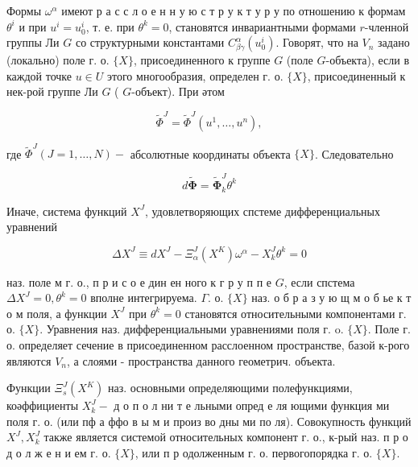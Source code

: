 \documentclass[10pt]{article}
\begin{document}
Формы $\omega^{\alpha}$ имеют р а с с л о е н н у ю с т р у к т у р у по отношению к формам $\theta^{i}$ и при $u^{i}=u_{0}^{i}$, т. е. при $\theta^{k}=0$, становятся инвариантными формами $r$-членной группы Ли $G$ со структурными константами $C_{\beta \gamma}^{\alpha}\left(u_{0}^{i}\right)$. Говорят, что на $V_{n}$ задано (локально) поле г. о. $\{X\}$, присоединенного к группе $G$ (поле $G$-объекта), если в каждой точке $u \in U$ этого многообразия, определен г. о. $\{X\}$, присоединенный к нек-рой группе Ли $G$ ( $G$-объект). При әтом



\[

\widetilde{\Phi}^{J}=\tilde{\Phi}^{J}\left(u^{1}, \ldots, u^{n}\right),

\]



где $\tilde{\Phi}^{J}(J=1, \ldots, N)-$ абсолютные координаты объекта $\{X\}$. Следовательно



\[

d \tilde{\boldsymbol{\Phi}}=\widetilde{\boldsymbol{\Phi}}_{k}^{J} \theta^{k}

\]



Иначе, система функций $X^{J}$, удовлетворяющих спстеме дифференциальных уравнений



\[

\Delta X^{J} \equiv d X^{J}-\Xi_{\alpha}^{J}\left(X^{K}\right) \omega^{\alpha}-X_{k}^{J} \theta^{k}=0

\]



наз. поле м г. о., п р и с о е дин ен ного к г р у п п е $G$, если спстема $\Delta X^{J}=0, \theta^{k}=0$ вполне интегрируема. $\Gamma$. о. $\{X\}$ наз. о б р а з у ю щ м о б ье к т о м поля, а функции $X^{J}$ при $\theta^{k}=0$ становятся относительными компонентами г. о. $\{X\}$. Уравнения наз. дифференциальными уравнениями поля г. o. $\{X\}$. Поле г. о. определяет сечение в присоединенном расслоенном пространстве, базой к-рого являются $V_{n}$, а слоями - пространства данного геометрич. объекта.



Функции $\Xi_{s}^{J}\left(X^{K}\right)$ наз. основными определяющими полефункциями, коәффициенты $X_{k}^{J}-$ д о п о л ни т е льными опред е ля ющими функция ми поля г. о. (или пф а ффо в ы м и произ во дны ми по ля). Совокупность функций $X^{J}, X_{k}^{J}$ также является системой относительных компонент г. о., к-рый наз. п р о д о л ж е н и ем г. о. $\{X\}$, или п р одолженным г. о. первогопорядка г. о. $\{X\}$.
\end{document}
